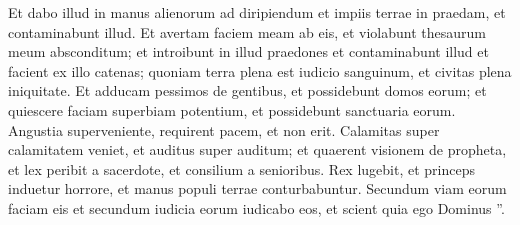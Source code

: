 \begin{biblechapter}
\begin{biblechapter}
\begin{biblechapter}
\begin{biblechapter}
\begin{biblechapter}
\begin{biblechapter}
\begin{biblechapter}
\verse Et dabo illud in manus alienorum ad diripiendum et impiis terrae in praedam, et contaminabunt illud. 
\verse Et avertam faciem meam ab eis, et violabunt thesaurum meum absconditum; et introibunt in illud praedones et contaminabunt illud 
\verse et facient ex illo catenas; quoniam terra plena est iudicio sanguinum, et civitas plena iniquitate. 
\verse Et adducam pessimos de gentibus, et possidebunt domos eorum; et quiescere faciam superbiam potentium, et possidebunt sanctuaria eorum. 
\verse Angustia superveniente, requirent pacem, et non erit. 
\verse Calamitas super calamitatem veniet, et auditus super auditum; et quaerent visionem de propheta, et lex peribit a sacerdote, et consilium a senioribus. 
\verse Rex lugebit, et princeps induetur horrore, et manus populi terrae conturbabuntur. Secundum viam eorum faciam eis et secundum iudicia eorum iudicabo eos, et scient quia ego Dominus ”.
 

\end{biblechapter}
\end{biblechapter}
\end{biblechapter}
\end{biblechapter}
\end{biblechapter}
\end{biblechapter}
\end{biblechapter}
